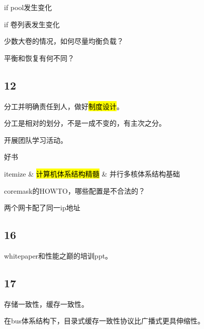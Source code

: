 if pool发生变化

if 卷列表发生变化

少数大卷的情况，如何尽量均衡负载？

平衡和恢复有何不同？

\subsection{12}

分工并明确责任到人，做好\hl{制度设计}。

分工是相对的划分，不是一成不变的，有主次之分。

开展团队学习活动。

好书
\begin{myeasylist}{itemize}
& \hl{计算机体系结构精髓}
& 并行多核体系结构基础
\end{myeasylist}

coremask的HOWTO，哪些配置是不合法的？

两个网卡配了同一ip地址

\subsection{16}

whitepaper和性能之巅的培训ppt。

\subsection{17}

存储一致性，缓存一致性。

在bus体系结构下，目录式缓存一致性协议比广播式更具伸缩性。
